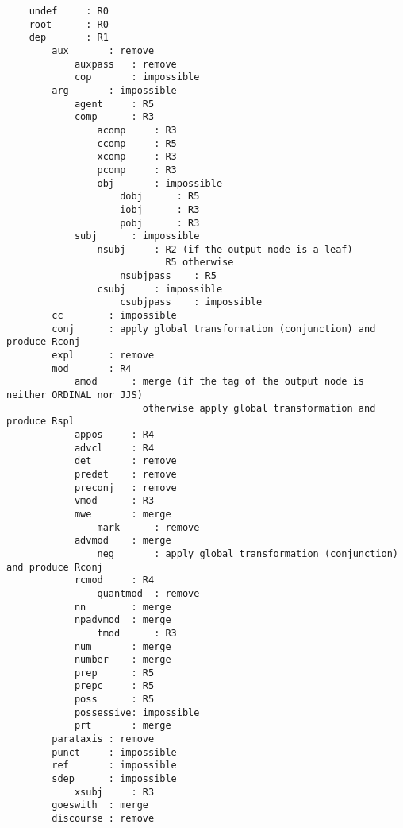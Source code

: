 \begin{footnotesize}
\begin{verbatim}
    undef     : R0
    root      : R0
    dep       : R1
        aux       : remove
            auxpass   : remove
            cop       : impossible
        arg       : impossible
            agent     : R5
            comp      : R3
                acomp     : R3
                ccomp     : R5
                xcomp     : R3
                pcomp     : R3
                obj       : impossible
                    dobj      : R5
                    iobj      : R3
                    pobj      : R3
            subj      : impossible
                nsubj     : R2 (if the output node is a leaf) 
                            R5 otherwise
                    nsubjpass    : R5
                csubj     : impossible
                    csubjpass    : impossible
        cc        : impossible
        conj      : apply global transformation (conjunction) and produce Rconj
        expl      : remove
        mod       : R4
            amod      : merge (if the tag of the output node is neither ORDINAL nor JJS) 
                        otherwise apply global transformation and produce Rspl
            appos     : R4
            advcl     : R4
            det       : remove
            predet    : remove
            preconj   : remove
            vmod      : R3
            mwe       : merge
                mark      : remove
            advmod    : merge
                neg       : apply global transformation (conjunction) and produce Rconj
            rcmod     : R4
                quantmod  : remove
            nn        : merge
            npadvmod  : merge
                tmod      : R3
            num       : merge
            number    : merge
            prep      : R5
            prepc     : R5
            poss      : R5
            possessive: impossible
            prt       : merge
        parataxis : remove
        punct     : impossible
        ref       : impossible
        sdep      : impossible
            xsubj     : R3
        goeswith  : merge
        discourse : remove
\end{verbatim}
\end{footnotesize}
